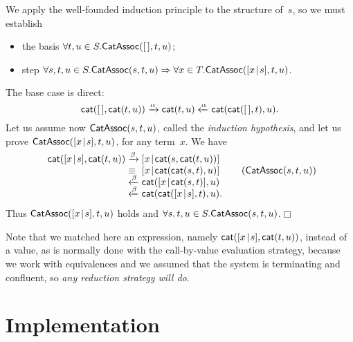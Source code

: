 We apply the well\hyp{}founded induction principle to the structure
of~\(s\), so we must establish
\begin{itemize}

  \item the basis \(\forall t,u \in S.\textsf{CatAssoc}({[\,],t,u})\);

  \item step \(\forall s,t,u \in S.\textsf{CatAssoc}({s,t,u})
    \Rightarrow \forall x \in T.\textsf{CatAssoc}({[{x}\!\mid\!{s}],t,u})\).

\end{itemize}
The base case is direct:
\begin{equation*}
  \fun{cat}(\el,\fun{cat}(t,u))
\xrightarrow{\smash{\alpha}} \fun{cat}(t,u)
\xleftarrow{\smash{\alpha}}
\fun{cat}(\fun{cat}(\el,t),u).
\index{cat@\fun{cat/2}}
\end{equation*}
Let us assume now \(\textsf{CatAssoc}({s,t,u})\), called the
\emph{induction hypothesis}, and
let us prove
\(\textsf{CatAssoc}({[{x}\!\mid\!{s}],t,u})\),
for any term~\(x\). We have
\begin{equation*}
\begin{array}{r@{\;}l@{\;}l@{\qquad}r@{}}
  \fun{cat}(\cons{x}{s},\fun{cat}(t,u))
& \xrightarrow{\smash\beta}
& \cons{x}{\fun{cat}(s,\fun{cat}(t,u))}\\
& \equiv
& \cons{x}{\fun{cat}(\fun{cat}(s,t),u)}
& (\pred{CatAssoc}{s,t,u})\\
& \xleftarrow{\smash\beta}
& \fun{cat}(\cons{x}{\fun{cat}(s,t)},u)\\
& \xleftarrow{\smash\beta}
& \fun{cat}(\fun{cat}(\cons{x}{s},t),u).\index{cat@\fun{cat/2}}
\end{array}
\end{equation*}
Thus
\(\textsf{CatAssoc}({[{x}\!\mid\!{s}],t,u})\) holds and \(\forall s,t,u \in
S.\textsf{CatAssoc}({s,t,u})\).\hfill\(\Box\)

Note that we matched here an expression, namely
\(\textsf{cat}([{x}\!\mid\!{s}],\textsf{cat}(t,u))\), instead of a value, as is
normally done with the call\hyp{}by\hyp{}value evaluation strategy,
because we work with equivalences and we assumed that the system is
terminating and confluent, so \emph{any reduction strategy will do}.


\section{Implementation}
\label{sec:implementation}


